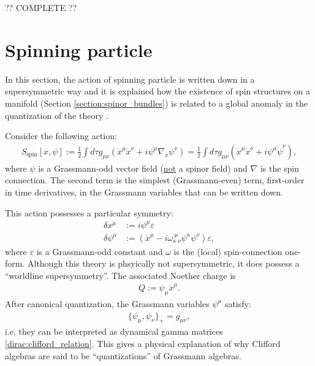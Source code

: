     ?? COMPLETE ??

\section{Spinning particle}

    In this section, the action of spinning particle is written down in a supersymmetric way \cite{spinning_particle} and it is explained how the existence of spin structures on a manifold (Section \ref{section:spinor_bundles}) is related to a global anomaly in the quantization of the theory \cite{witten_string_structure}.

    Consider the following action:
    \begin{gather}
        S_\mathrm{spin}[x,\psi] := \frac{1}{2}\int d\tau g_{\mu\nu}\left(\dot{x}^\mu\dot{x}^\nu + i\psi^\mu\nabla_{\dot{x}}\psi^\nu\right) = \frac{1}{2}\int d\tau g_{\mu\nu}\left(\dot{x}^\mu\dot{x}^\nu + i\psi^\mu\dot{\psi}^\nu\right),
    \end{gather}
    where $\psi$ is a Grassmann-odd vector field (\underline{not} a spinor field) and $\nabla$ is the spin connection. The second term is the simplest (Grassmann-even) term, first-order in time derivatives, in the Grassmann variables that can be written down.

    This action possesses a particular symmetry:
    \begin{align}
        \delta x^\mu &:= i\psi^\mu\varepsilon\\
        \delta\psi^\mu &:= \left(\dot{x}^\mu - i\omega^{\ \mu\ }_{\kappa\ \nu}\psi^\kappa\psi^\nu\right)\varepsilon,
    \end{align}
    where $\varepsilon$ is a Grassmann-odd constant and $\omega$ is the (local) spin-connection one-form. Although this theory is phsyically not supersymmetric, it does possess a ``worldline supersymmetry''. The associated Noether charge is
    \begin{gather}
        Q := \psi_\mu\dot{x}^\mu.
    \end{gather}
    After canonical quantization, the Grassmann variables $\psi^\mu$ satisfy:
    \begin{gather}
        \{\psi_\mu,\psi_\nu\}_+ = g_{\mu\nu},
    \end{gather}
    i.e. they can be interpreted as dynamical gamma matrices \eqref{dirac:clifford_relation}. This gives a physical explanation of why Clifford algebras are said to be ``quantizations'' of Grassmann algebras.


